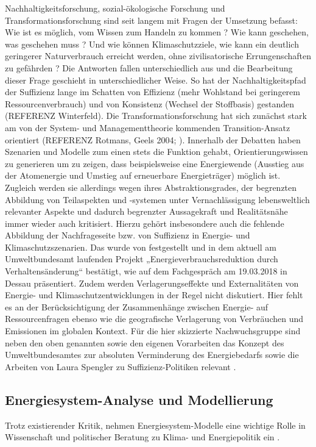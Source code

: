 \documentclass[a4paper,11pt,twoside]{scrartcl}
\begin{document}
Nachhaltigkeitsforschung, sozial-ökologische Forschung und Transformationsforschung sind seit langem mit Fragen der Umsetzung befasst: Wie ist es möglich, vom Wissen zum Handeln zu kommen ? \cite{BMBF2008} Wie kann geschehen, was geschehen muss ? \cite{Linz2000} Und wie können Klimaschutzziele, wie kann ein deutlich geringerer Naturverbrauch erreicht werden, ohne zivilisatorische Errungenschaften zu gefährden ? \cite{Sommer2016,WGBU2011} Die Antworten fallen unterschiedlich aus und die Bearbeitung dieser Frage geschieht in unterschiedlicher Weise. So hat der Nachhaltigkeitspfad der Suffizienz lange im Schatten von Effizienz (mehr Wohlstand bei geringerem Ressourcenverbrauch) und von Konsistenz (Wechsel der Stoffbasis) gestanden (REFERENZ Winterfeld). Die Transformationsforschung hat sich zunächst stark am von der System- und Managementtheorie kommenden Transition-Ansatz orientiert (REFERENZ Rotmans, Geels 2004; \cite{Loorbach2010}). Innerhalb der Debatten haben Szenarien und Modelle zum einen stets die Funktion gehabt, Orientierungswissen zu generieren um zu zeigen, dass beispielsweise eine Energiewende (Ausstieg aus der Atomenergie und Umstieg auf erneuerbare Energieträger) möglich ist. Zugleich werden sie allerdings wegen ihres Abstraktionsgrades, der begrenzten Abbildung von Teilaspekten und -systemen unter Vernachlässigung lebensweltlich relevanter Aspekte und dadurch begrenzter Aussagekraft und Realitätsnähe immer wieder auch kritisiert. Hierzu gehört insbesondere auch die fehlende Abbildung der Nachfrageseite bzw. von Suffizienz in Energie- und Klimaschutzszenarien. Das wurde von \cite{SAMADI2017} festgestellt und in dem aktuell am Umweltbundesamt laufenden Projekt „Energieverbrauchsreduktion durch Verhaltensänderung“ bestätigt, wie auf dem Fachgespräch am 19.03.2018 in Dessau präsentiert. Zudem werden Verlagerungseffekte und Externalitäten von Energie- und Klimaschutzentwicklungen in der Regel nicht diskutiert. Hier fehlt es an der Berücksichtigung der Zusammenhänge zwischen Energie- auf Ressourcenfragen ebenso wie die geografische Verlagerung von Verbräuchen und Emissionen im globalen Kontext.
Für die hier skizzierte Nachwuchsgruppe sind neben den oben genannten sowie den eigenen Vorarbeiten das Konzept des Umweltbundesamtes zur absoluten Verminderung des Energiebedarfs \cite{UBA2016} sowie die Arbeiten von Laura Spengler zu Suffizienz-Politiken relevant \cite{Spengler2016,Spengler2018}.

\subsection*{Energiesystem-Analyse und Modellierung}
Trotz existierender Kritik, nehmen Energiesystem-Modelle eine wichtige Rolle in Wissenschaft und politischer Beratung zu Klima- und Energiepolitik ein \cite{Dieckhoff2015}.
\end{document}
